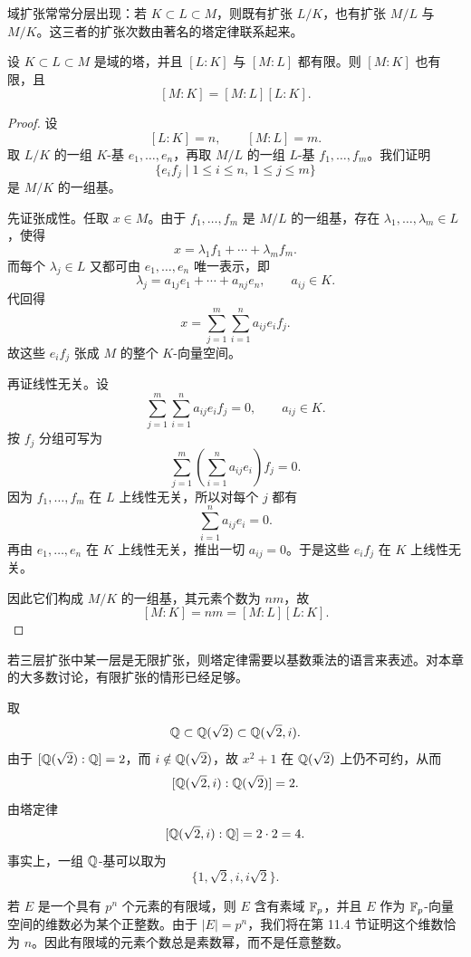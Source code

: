 域扩张常常分层出现：若 $K\subset L\subset M$，则既有扩张 $L/K$，也有扩张 $M/L$ 与 $M/K$。这三者的扩张次数由著名的塔定律联系起来。

\begin{theorem}[塔定律]
设 $K\subset L\subset M$ 是域的塔，并且 $[L:K]$ 与 $[M:L]$ 都有限。则 $[M:K]$ 也有限，且
\[
[M:K]=[M:L][L:K].
\]
\end{theorem}

\begin{proof}
设
\[
[L:K]=n,\qquad [M:L]=m.
\]
取 $L/K$ 的一组 $K$-基 $e_1,\dots,e_n$，再取 $M/L$ 的一组 $L$-基 $f_1,\dots,f_m$。我们证明
\[
\{e_i f_j\mid 1\le i\le n,\ 1\le j\le m\}
\]
是 $M/K$ 的一组基。

先证张成性。任取 $x\in M$。由于 $f_1,\dots,f_m$ 是 $M/L$ 的一组基，存在 $\lambda_1,\dots,\lambda_m\in L$，使得
\[
 x=\lambda_1 f_1+\cdots+\lambda_m f_m.
\]
而每个 $\lambda_j\in L$ 又都可由 $e_1,\dots,e_n$ 唯一表示，即
\[
\lambda_j=a_{1j}e_1+\cdots+a_{nj}e_n,\qquad a_{ij}\in K.
\]
代回得
\[
 x=\sum_{j=1}^m\sum_{i=1}^n a_{ij}e_i f_j.
\]
故这些 $e_i f_j$ 张成 $M$ 的整个 $K$-向量空间。

再证线性无关。设
\[
\sum_{j=1}^m\sum_{i=1}^n a_{ij}e_i f_j=0,\qquad a_{ij}\in K.
\]
按 $f_j$ 分组可写为
\[
\sum_{j=1}^m \left(\sum_{i=1}^n a_{ij}e_i\right)f_j=0.
\]
因为 $f_1,\dots,f_m$ 在 $L$ 上线性无关，所以对每个 $j$ 都有
\[
\sum_{i=1}^n a_{ij}e_i=0.
\]
再由 $e_1,\dots,e_n$ 在 $K$ 上线性无关，推出一切 $a_{ij}=0$。于是这些 $e_i f_j$ 在 $K$ 上线性无关。

因此它们构成 $M/K$ 的一组基，其元素个数为 $nm$，故
\[
[M:K]=nm=[M:L][L:K].
\]
\end{proof}

\begin{remark}
若三层扩张中某一层是无限扩张，则塔定律需要以基数乘法的语言来表述。对本章的大多数讨论，有限扩张的情形已经足够。
\end{remark}

\begin{example}
取
\[
\mathbb{Q}\subset \mathbb{Q}(\sqrt2)\subset \mathbb{Q}(\sqrt2,i).
\]
由于 $[\mathbb{Q}(\sqrt2):\mathbb{Q}]=2$，而 $i\notin \mathbb{Q}(\sqrt2)$，故 $x^2+1$ 在 $\mathbb{Q}(\sqrt2)$ 上仍不可约，从而
\[
[\mathbb{Q}(\sqrt2,i):\mathbb{Q}(\sqrt2)]=2.
\]
由塔定律
\[
[\mathbb{Q}(\sqrt2,i):\mathbb{Q}]=2\cdot 2=4.
\]
事实上，一组 $\mathbb{Q}$-基可以取为
\[
\{1,\sqrt2,i,i\sqrt2\}.
\]
\end{example}

\begin{example}
若 $E$ 是一个具有 $p^n$ 个元素的有限域，则 $E$ 含有素域 $\mathbb{F}_p$，并且 $E$ 作为 $\mathbb{F}_p$-向量空间的维数必为某个正整数。由于 $|E|=p^n$，我们将在第 11.4 节证明这个维数恰为 $n$。因此有限域的元素个数总是素数幂，而不是任意整数。
\end{example}

